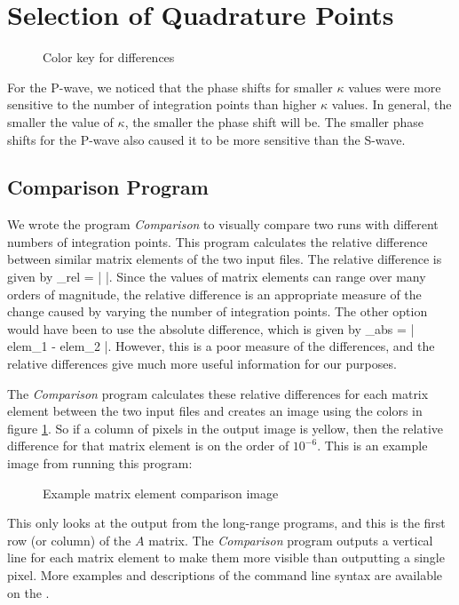 \documentclass[Dissertation.tex]{subfiles}
\begin{document}
\section{Selection of Quadrature Points}
\label{sec:SelQuadPoints2}

\begin{figure}[H]
	\caption{Color key for differences}
	\label{fig:ColorKey}
\end{figure}

For the P-wave, we noticed that the phase shifts for smaller $\kappa$ values were more sensitive to the number of integration points than higher $\kappa$ values. In general, the smaller the value of $\kappa$, the smaller the phase shift will be. The smaller phase shifts for the P-wave also caused it to be more sensitive than the S-wave.

\subsection{Comparison Program}
We wrote the program \emph{Comparison} to visually compare two runs with different numbers of integration points. This program calculates the relative difference between similar matrix elements of the two input files. The relative difference is given by
\beq
{}_{rel} = \left|  \right|.
\eeq
Since the values of matrix elements can range over many orders of magnitude, the relative difference is an appropriate measure of the change caused by varying the number of integration points. The other option would have been to use the absolute difference, which is given by 
\beq
{}_{abs} = \left| elem_1 - elem_2 \right|.
\eeq
However, this is a poor measure of the differences, and the relative differences give much more useful information for our purposes.

The \emph{Comparison} program calculates these relative differences for each matrix element between the two input files and creates an image using the colors in figure \ref{fig:ColorKey}. So if a column of pixels in the output image is yellow, then the relative difference for that matrix element is on the order of $10^{-6}$. This is an example image from running this program:
\begin{figure}[H]
	\centering
	\caption{Example matrix element comparison image}
	\label{fig:QuadExample}
\end{figure}
This only looks at the output from the long-range programs, and this is the first row (or column) of the $A$ matrix. The \emph{Comparison} program outputs a vertical line for each matrix element to make them more visible than outputting a single pixel. More examples and descriptions of the command line syntax are available on the  \cite{Wiki}.
\end{document}
